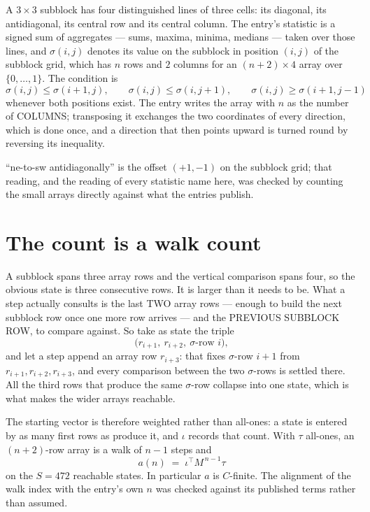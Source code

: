 \documentclass[11pt,a4paper]{article}
\theoremstyle{plain}
\theoremstyle{definition}
\begin{document}
A $3\times3$ subblock has four distinguished lines of three cells: its diagonal, its
antidiagonal, its central row and its central column. The entry's statistic is a signed sum of
aggregates --- sums, maxima, minima, medians --- taken over those lines, and $\sigma(i,j)$
denotes its value on the subblock in position $(i,j)$ of the subblock grid, which has $n$ rows
and $2$ columns for an $(n+2)\times4$ array over $\{0,\dots,1\}$. The condition is
\[
\sigma(i,j)\le\sigma(i+1,j),\qquad \sigma(i,j)\le\sigma(i,j+1),\qquad \sigma(i,j)\ge\sigma(i+1,j-1)
\]
whenever both positions exist. The entry writes the array with $n$ as the number of COLUMNS; transposing it exchanges the two coordinates of every direction, which is done once, and a direction that then points upward is turned round by reversing its inequality.

``ne-to-sw antidiagonally'' is the offset $(+1,-1)$ on the subblock grid; that reading, and
the reading of every statistic name here, was checked by counting the small arrays directly
against what the entries publish.

\section{The count is a walk count}

A subblock spans three array rows and the vertical comparison spans four, so the obvious state
is three consecutive rows. It is larger than it needs to be. What a step actually consults is
the last TWO array rows --- enough to build the next subblock row once one more row arrives ---
and the PREVIOUS SUBBLOCK ROW, to compare against. So take as state the triple
\[
\bigl(r_{i+1},\ r_{i+2},\ \sigma\text{-row }i\bigr),
\]
and let a step append an array row $r_{i+3}$: that fixes $\sigma$-row $i+1$ from
$r_{i+1},r_{i+2},r_{i+3}$, and every comparison between the two $\sigma$-rows is settled
there. All the third rows that produce the same $\sigma$-row collapse into one state, which is
what makes the wider arrays reachable.

The starting vector is therefore weighted rather than all-ones: a state is entered by as many
first rows as produce it, and $\iota$ records that count. With $\tau$ all-ones, an
$(n+2)$-row array is a walk of $n-1$ steps and
\[
a(n)\;=\;\iota^{\!\top}M^{\,n-1}\tau
\]
on the $S=472$ reachable states. In particular $a$ is $C$-finite. The alignment of the walk
index with the entry's own $n$ was checked against its published terms rather than assumed.
\end{document}
